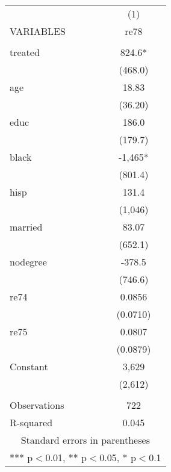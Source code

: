 \begin{tabular}{lc} \hline
 & (1) \\
VARIABLES & re78 \\ \hline
 &  \\
treated & 824.6* \\
 & (468.0) \\
age & 18.83 \\
 & (36.20) \\
educ & 186.0 \\
 & (179.7) \\
black & -1,465* \\
 & (801.4) \\
hisp & 131.4 \\
 & (1,046) \\
married & 83.07 \\
 & (652.1) \\
nodegree & -378.5 \\
 & (746.6) \\
re74 & 0.0856 \\
 & (0.0710) \\
re75 & 0.0807 \\
 & (0.0879) \\
Constant & 3,629 \\
 & (2,612) \\
 &  \\
Observations & 722 \\
 R-squared & 0.045 \\ \hline
\multicolumn{2}{c}{ Standard errors in parentheses} \\
\multicolumn{2}{c}{ *** p$<$0.01, ** p$<$0.05, * p$<$0.1} \\
\end{tabular}
